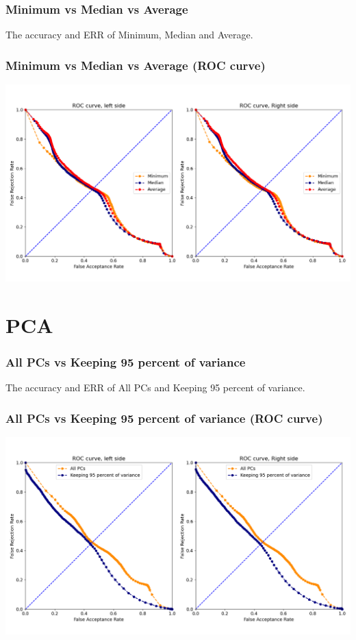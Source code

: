 \documentclass{beamer}
\begin{document}
\begin{frame}
\frametitle{Minimum vs Median vs Average}
\tiny
\begin{table}
\centering
\captionsetup{labelformat=empty}
\caption{\small The accuracy and ERR of Minimum, Median and Average.}
\label{tab:parameters condition}

\end{table}
\end{frame}


\begin{frame}
\centering
\frametitle{Minimum vs Median vs Average (ROC curve)}
\includegraphics[scale=0.3]{Manuscripts/src/figures/Minimum.png}
\end{frame}


\section{PCA}

\begin{frame}
\frametitle{All PCs vs Keeping 95 percent of variance}
\tiny
\begin{table}
\centering
\captionsetup{labelformat=empty}
\caption{\small The accuracy and ERR of All PCs and Keeping 95 percent of variance.}
\label{tab:parameters condition}

\end{table}
\end{frame}


\begin{frame}
\centering
\frametitle{All PCs vs Keeping 95 percent of variance (ROC curve)}
\includegraphics[scale=0.3]{Manuscripts/src/figures/PCA.png}
\end{frame}
\end{document}
